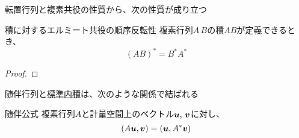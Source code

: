 \documentclass[../../../topic_linear-algebra]{subfiles}
\begin{document}
\sectionline

転置行列と複素共役の性質から、次の性質が成り立つ

\begin{theorem}{積に対するエルミート共役の順序反転性}
  複素行列$A\,B$の積$AB$が定義できるとき、
  \begin{equation*}
    (AB)^* = B^* A^*
  \end{equation*}
\end{theorem}

\begin{proof}
  \todo{}
\end{proof}

\sectionline

随伴行列と\hyperref[def:standard-inner-product-Cn]{標準内積}は、次のような関係で結ばれる

\begin{theorem}{随伴公式}
  複素行列$A$と計量空間上のベクトル$\vb*{u},\,\vb*{v}$に対し、
  \begin{equation*}
    (A\vb*{u}, \vb*{v}) = (\vb*{u}, A^*\vb*{v})
  \end{equation*}
\end{theorem}
\end{document}
